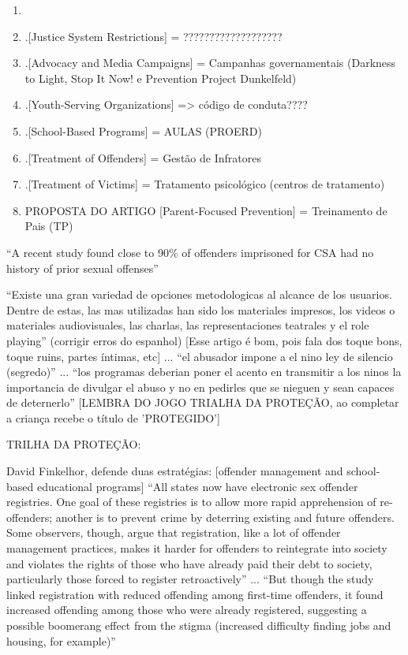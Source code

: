 \begin{enumerate}
  \item \cite{mendelson2015parent}

  \item .[Justice System Restrictions] = ???????????????????

  \item .[Advocacy and Media Campaigns] = Campanhas governamentais (Darkness to Light, Stop It Now! e Prevention Project Dunkelfeld)

  \item .[Youth-Serving Organizations] => código de conduta????

  \item .[School-Based Programs] = AULAS (PROERD)

  \item .[Treatment of Offenders] = Gestão de Infratores

  \item .[Treatment of Victims] = Tratamento psicológico (centros de tratamento)
  
  \item PROPOSTA DO ARTIGO [Parent-Focused Prevention] = Treinamento de Pais (TP)
\end{enumerate}

``A recent study found close to 90\% of offenders imprisoned for CSA had no history of prior sexual offenses'' \cite{mendelson2015parent}


``Existe una gran variedad de opciones metodologicas al alcance de los usuarios. Dentre de estas, las mas utilizadas han sido los materiales impresos, los videos o materiales audiovisuales, las charlas, las representaciones teatrales y el role playing'' (corrigir erros do espanhol) [Esse artigo é bom, pois fala dos toque bons, toque ruins, partes íntimas, etc] ... ``el abusador impone a el nino ley de silencio (segredo)'' ... ``los programas deberian poner el acento en transmitir a los ninos la importancia de divulgar el abuso y no en pedirles que se nieguen y sean capaces de deternerlo'' [LEMBRA DO JOGO TRIALHA DA PROTEÇÃO, ao completar a criança recebe o título de 'PROTEGIDO'] \cite{martinez2011prevencion} 

TRILHA DA PROTEÇÃO: \cite{meyer2017analise}



David Finkelhor, defende duas estratégias: [offender management and school-based educational programs] ``All states now have electronic sex offender registries. One goal of these registries is to allow more rapid apprehension of re-offenders; another is to prevent crime by deterring existing and future offenders. Some observers, though, argue that registration, like a lot of offender management practices, makes it harder for offenders to reintegrate into society and violates the rights of those who have already paid their debt to society, particularly those forced to register retroactively'' ... ``But though the study linked registration with reduced offending among first-time offenders, it found increased offending among those who were already registered, suggesting a possible boomerang effect from the stigma (increased difficulty finding jobs and housing, for example)'' \cite{finkelhor2009prevention}



